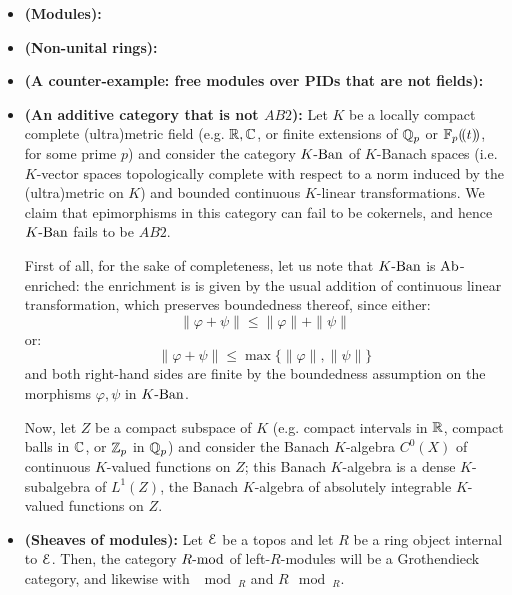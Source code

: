                     \begin{example} \label{examples: AB_categories}
                        \noindent
                        \begin{itemize}
                            \item \textbf{(Modules):}
                            \item \textbf{(Non-unital rings):}
                            \item \textbf{(A counter-example: free modules over PIDs that are not fields):}
                            \item \textbf{(An additive category that is not $AB2$):} Let $K$ be a locally compact complete (ultra)metric field (e.g. $\R, \bbC$, or finite extensions of $\Q_p$ or $\F_p(\!(t)\!)$, for some prime $p$) and consider the category $K\Ban$ of $K$-Banach spaces (i.e. $K$-vector spaces topologically complete with respect to a norm induced by the (ultra)metric on $K$) and bounded continuous $K$-linear transformations. We claim that epimorphisms in this category can fail to be cokernels, and hence $K\Ban$ fails to be $AB2$.
                            
                            First of all, for the sake of completeness, let us note that $K\Ban$ is $\Ab$-enriched: the enrichment is is given by the usual addition of continuous linear transformation, which preserves boundedness thereof, since either:
                                $$\|\varphi + \psi\| \leq \|\varphi\| + \|\psi\|$$
                            or:
                                $$\|\varphi + \psi\| \leq \max\{\|\varphi\|, \|\psi\|\}$$
                            and both right-hand sides are finite by the boundedness assumption on the morphisms $\varphi, \psi$ in $K\Ban$.
                            
                            Now, let $Z$ be a compact subspace of $K$ (e.g. compact intervals in $\R$, compact balls in $\bbC$, or $\Z_p$ in $\Q_p$) and consider the Banach $K$-algebra $C^0(X)$ of continuous $K$-valued functions on $Z$; this Banach $K$-algebra is a dense $K$-subalgebra of $L^1(Z)$, the Banach $K$-algebra of absolutely integrable $K$-valued functions on $Z$.
                            \item \textbf{(Sheaves of modules):} Let $\E$ be a topos and let $R$ be a ring object internal to $\E$. Then, the category $R\mod$ of left-$R$-modules will be a Grothendieck category, and likewise with $\mod_R$ and $R\mod_R$.
                        \end{itemize}
                    \end{example}
                    
